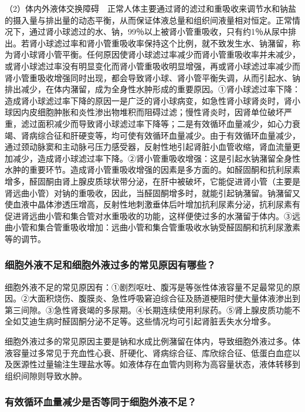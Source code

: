 （2）体内外液体交换障碍　正常人体主要通过肾的滤过和重吸收来调节水和钠盐的摄入量与排出量的动态平衡，从而保证体液总量和组织间液量相对恒定。正常情况下，通过肾小球滤过的水、钠，99％以上被肾小管重吸收，只有约1％从尿中排出。若肾小球滤过率和肾小管重吸收率保持这个比例，就不致发生水、钠潴留，称为肾小球肾小管平衡。任何原因使肾小球滤过率减少而肾小管重吸收率并未减少，或肾小球滤过率没有明显变化而肾小管重吸收明显增强，再或肾小球滤过率减少而肾小管重吸收增强同时出现，都会导致肾小球、肾小管平衡失调，从而引起水、钠排出减少，在体内潴留，成为全身性水肿形成的重要原因。①肾小球滤过率下降：造成肾小球滤过率下降的原因一是广泛的肾小球病变，如急性肾小球肾炎时，肾小球因内皮细胞肿胀和炎性渗出物堆积而阻碍过滤；慢性肾炎时，因肾单位破坏严重，滤过面积减少而导致肾小球滤过率下降等；二是有效循环血量减少，如心力衰竭、肾病综合征和肝硬变等，均可使有效循环血量减少。由于有效循环血量减少，通过颈动脉窦和主动脉弓压力感受器，反射性地引起肾脏小血管收缩，肾血流量更加减少，造成肾小球滤过率下降。②肾小管重吸收增强：这是引起水钠潴留全身性水肿的重要环节。造成肾小管重吸收增强的因素是多方面的。如醛固酮和抗利尿素增多，醛固酮由肾上腺皮质球状带分泌，在肝中被破坏，它能促进肾小管（主要是肾远曲小管）对钠的重吸收，因此，当醛固酮增多时，就能引起钠潴留。钠潴留又使血液中晶体渗透压增高，反射性地刺激垂体后叶增加抗利尿素分泌，抗利尿素有促进肾远曲小管和集合管对水重吸收的功能，这样便使过多的水潴留于体内。③远曲小管和集合管重吸收增加：远曲小管和集合管重吸收水钠受醛固酮和抗利尿激素等的调节。

\subsubsection{细胞外液不足和细胞外液过多的常见原因有哪些？}

细胞外液不足的常见原因有：①剧烈呕吐、腹泻是等张性体液容量不足最常见的原因。②大面积烧伤、腹膜炎、急性呼吸窘迫综合征及肠道梗阻时使大量体液渗出到第三间隙。③急性肾衰竭的多尿期。④长期连续使用利尿药。⑤肾上腺皮质功能不全如艾迪生病时醛固酮分泌不足等。这些情况均可引起肾脏丢失水分增多。

细胞外液过多的常见原因主要是钠和水成比例潴留在体内，导致细胞外液过多。体液容量过多常见于充血性心衰、肝硬化、肾病综合征、库欣综合征、低蛋白血症以及医源性过量输注生理盐水等。如液体存在血管内则称为高容量状态，液体转移到组织间隙则导致水肿。

\subsubsection{有效循环血量减少是否等同于细胞外液不足？}

